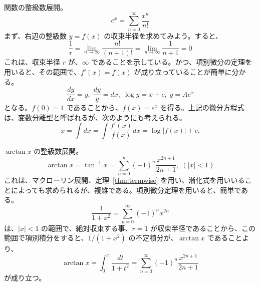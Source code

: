 \begin{eg}
関数の整級数展開。
$$e^x = \sum_{n=0}^\infty \frac{x^n}{n!}$$
まず、右辺の整級数 $y = f(x)$ の収束半径を求めてみよう。すると、
$$\frac1r = \lim_{n\to\infty}\frac{n!}{(n+1)!} = \lim_{n\to\infty}\frac{1}{n+1} = 0$$
これは、収束半径 $r$ が、$\infty$ であることを示している。かつ、項別微分の定理を用いると、その範囲で、$f'(x) = f(x)$ が成り立っていることが簡単に分かる。
$$\frac{dy}{dx} = y,\;\frac{dy}{y} = dx,\; \log y = x + c,\;y = Ae^x$$
となる。$f(0) = 1$ であることから、$f(x) = e^x$ を得る。上記の微分方程式は、変数分離型と呼ばれるが、次のようにも考えられる。
$$x = \int dx = \int\frac{f'(x)}{f(x)}dx = \log |f(x)| + c.$$
\end{eg}

\begin{eg}
$\arctan x$ の整級数展開。
$$\arctan x = \tan^{-1}x = \sum_{n=0}^\infty (-1)^n\frac{x^{2n+1}}{2n+1},\;(|x|<1)$$
これは、マクローリン展開、定理~\ref{thm:termwise} を用い、漸化式を用いいることによっても求められるが、複雑である。項別微分定理を用いると、簡単である。
$$\frac{1}{1+x^2} = \sum_{n=0}^\infty (-1)^n{x^{2n}}$$
は、$|x|<1$ の範囲で、絶対収束する事、$r = 1$ が収束半径であることから、この範囲で項別積分をすると、$1/(1+x^2)$ の不定積分が、$\arctan x$ であることより、
$$\arctan x = \int_0^x \frac{dt}{1+t^2} = \sum_{n=0}^\infty (-1)^n\frac{x^{2n+1}}{2n+1}$$
が成り立つ。
\end{eg}
